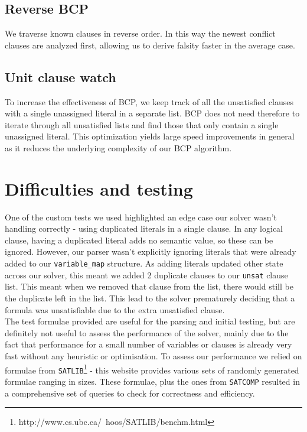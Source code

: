 \documentclass[a4paper]{article}
\begin{document}
\subsection{Reverse BCP}

We traverse known clauses in reverse order. In this way the newest conflict clauses are analyzed first, allowing us to derive falsity faster in the average case.

\subsection{Unit clause watch}

To increase the effectiveness of BCP, we keep track of all the unsatisfied clauses with a single unassigned literal in a separate list. BCP does not need therefore to iterate through all unsatisfied lists and find those that only contain a single unassigned literal. This optimization yields large speed improvements in general as it reduces the underlying complexity of our BCP algorithm.

\section{Difficulties and testing}

One of the custom tests we used highlighted an edge case our solver wasn't handling correctly - using duplicated literals in a single clause. In any logical clause, having a duplicated literal adds no semantic value, so these can be ignored. However, our parser wasn't explicitly ignoring literals that were already added to our \texttt{variable\_map} structure. As adding literals updated other state across our solver, this meant we added 2 duplicate clauses to our \texttt{unsat} clause list. This meant when we removed that clause from the list, there would still be the duplicate left in the list. This lead to the solver prematurely deciding that a formula was unsatisfiable due to the extra unsatisfied clause. \\

The test formulae provided are useful for the parsing and initial testing, but are definitely not useful to assess the performance of the solver, mainly due to the fact that performance for a small number of variables or clauses is already very fast without any heuristic or optimisation. To assess our performance we relied on formulae from \texttt{SATLIB}\footnote{http://www.cs.ubc.ca/~hoos/SATLIB/benchm.html} - this website provides various sets of randomly generated formulae ranging in sizes.
These formulae, plus the ones from \texttt{SATCOMP} resulted in a comprehensive set of queries to check for correctness and efficiency. \\
\end{document}
